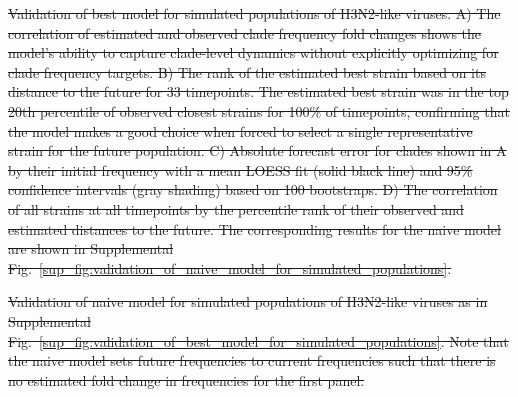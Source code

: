 \documentclass[9pt,lineno]{elife} %
\providecommand{\DIFdel}[1]{{\protect\color{red}\sout{#1}}}                      %
\providecommand{\DIFdelFL}[1]{\DIFdel{#1}} %
\providecommand{\DIFdeltex}[1]{{\protect\color{red}\sout{#1}}}                      %
\providecommand{\DIFdelFL}[1]{\DIFdel{#1}} %
\providecommand{\DIFdel}[1]{\texorpdfstring{\DIFdeltex{#1}}{}} %
\begin{document}
{%
\DIFdelFL{Validation of best model for simulated populations of H3N2-like viruses.
  A) The correlation of estimated and observed clade frequency fold changes shows the model's ability to capture clade-level dynamics without explicitly optimizing for clade frequency targets.
  B) The rank of the estimated best strain based on its distance to the future for 33 timepoints.
  The estimated best strain was in the top 20th percentile of observed closest strains for 100\% of timepoints, confirming that the model makes a good choice when forced to select a single representative strain for the future population.
  C) Absolute forecast error for clades shown in A by their initial frequency with a mean LOESS fit (solid black line) and 95\% confidence intervals (gray shading) based on 100 bootstraps.
  D) The correlation of all strains at all timepoints by the percentile rank of their observed and estimated distances to the future.
  The corresponding results for the naive model are shown in Supplemental Fig.~\ref{sup_fig:validation_of_naive_model_for_simulated_populations}.
  }}

{%
\DIFdelFL{Validation of naive model for simulated populations of H3N2-like viruses as in Supplemental Fig.~\ref{sup_fig:validation_of_best_model_for_simulated_populations}.
  Note that the naive model sets future frequencies to current frequencies such that there is no estimated fold change in frequencies for the first panel.
  }}
\end{document}
